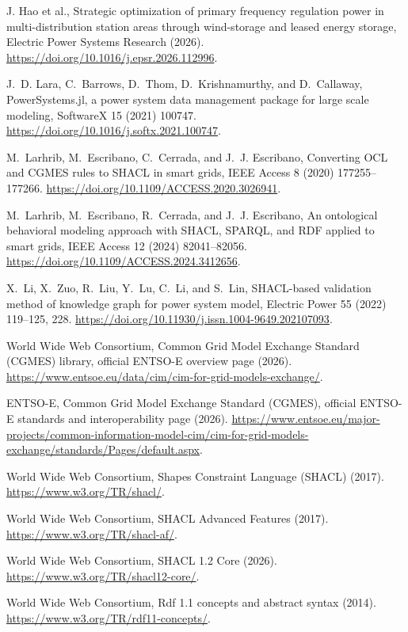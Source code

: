 J. Hao et al., Strategic optimization of primary frequency regulation power in
  multi-distribution station areas through wind-storage and leased energy
  storage, Electric Power Systems Research (2026).
\url{https://doi.org/10.1016/j.epsr.2026.112996}.

J.~D. Lara, C.~Barrows, D.~Thom, D.~Krishnamurthy, and D.~Callaway,
  PowerSystems.jl, a power system data management package for large scale
  modeling, SoftwareX 15 (2021) 100747.
\url{https://doi.org/10.1016/j.softx.2021.100747}.

M.~Larhrib, M.~Escribano, C.~Cerrada, and J.~J. Escribano, Converting OCL and
  CGMES rules to SHACL in smart grids, IEEE Access 8 (2020) 177255--177266.
\url{https://doi.org/10.1109/ACCESS.2020.3026941}.

M.~Larhrib, M.~Escribano, R.~Cerrada, and J.~J. Escribano, An ontological
  behavioral modeling approach with SHACL, SPARQL, and RDF applied to smart
  grids, IEEE Access 12 (2024) 82041--82056.
\url{https://doi.org/10.1109/ACCESS.2024.3412656}.

X.~Li, X.~Zuo, R.~Liu, Y.~Lu, C.~Li, and S.~Lin, SHACL-based validation method
  of knowledge graph for power system model, Electric Power 55 (2022)
  119--125, 228.
\url{https://doi.org/10.11930/j.issn.1004-9649.202107093}.

{World Wide Web Consortium}, Common Grid Model Exchange Standard (CGMES)
  library, official ENTSO-E overview page (2026).
\url{https://www.entsoe.eu/data/cim/cim-for-grid-models-exchange/}.

{ENTSO-E}, Common Grid Model Exchange Standard (CGMES), official ENTSO-E
  standards and interoperability page (2026).
\url{https://www.entsoe.eu/major-projects/common-information-model-cim/cim-for-grid-models-exchange/standards/Pages/default.aspx}.

{World Wide Web Consortium}, Shapes Constraint Language (SHACL) (2017).
\url{https://www.w3.org/TR/shacl/}.

{World Wide Web Consortium}, SHACL Advanced Features (2017).
\url{https://www.w3.org/TR/shacl-af/}.

{World Wide Web Consortium}, SHACL 1.2 Core (2026).
\url{https://www.w3.org/TR/shacl12-core/}.

{World Wide Web Consortium}, Rdf
  1.1 concepts and abstract syntax (2014).
\url{https://www.w3.org/TR/rdf11-concepts/}.

